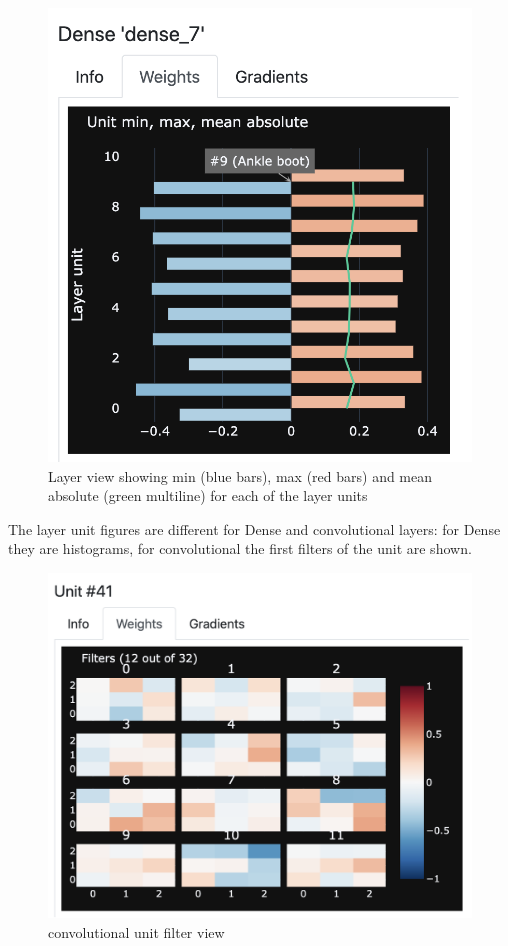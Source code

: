 \begin{figure}[H]
    \centering
    \includegraphics[scale=0.3]{images/dnn-viewer/LayerMinimax.png}
    \caption{Layer view showing min (blue bars), max (red bars) and mean absolute (green multiline) for each of the layer units}
    \label{fig:dnn-viewer-layer-minimax}
\end{figure}


The layer unit figures are different for Dense and convolutional layers: for Dense they are histograms, for convolutional the first filters of the unit are shown.

\begin{figure}[H]
    \centering
    \includegraphics[scale=0.3]{images/dnn-viewer/ConvoFiltersWeights.png}
    \caption{convolutional unit filter view}
    \label{fig:dnn-viewer-unit-convo-filters}
\end{figure}

